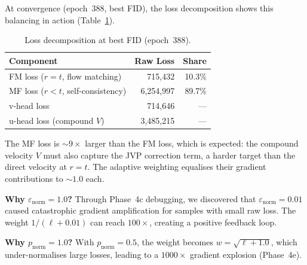At convergence (epoch~388, best FID), the loss decomposition shows this
balancing in action (Table~\ref{tab:loss_decomp}).

\begin{table}[ht]
\centering
\caption{Loss decomposition at best FID (epoch~388).}
\label{tab:loss_decomp}
\begin{tabular}{lrr}
\toprule
\textbf{Component} & \textbf{Raw Loss} & \textbf{Share} \\
\midrule
FM loss ($r=t$, flow matching)       & 715,432   & 10.3\% \\
MF loss ($r<t$, self-consistency)    & 6,254,997 & 89.7\% \\
\midrule
v-head loss                          & 714,646   & --- \\
u-head loss (compound $V$)           & 3,485,215 & --- \\
\bottomrule
\end{tabular}
\end{table}

The MF loss is ${\sim}9\times$ larger than the FM loss, which is expected: the
compound velocity $V$ must also capture the JVP correction term, a harder
target than the direct velocity at $r{=}t$.  The adaptive weighting equalises
their gradient contributions to ${\sim}1.0$ each.

\textbf{Why $\varepsilon_{\mathrm{norm}}{=}1.0$?}  Through Phase~4c debugging,
we discovered that $\varepsilon_{\mathrm{norm}}{=}0.01$ caused catastrophic
gradient amplification for samples with small raw loss.  The weight
$1/(\ell+0.01)$ can reach $100\times$, creating a positive feedback loop.

\textbf{Why $p_{\mathrm{norm}}{=}1.0$?}  With $p_{\mathrm{norm}}{=}0.5$, the
weight becomes $w = \sqrt{\ell+1.0}$, which under-normalises large
losses, leading to a $1000\times$ gradient explosion (Phase~4e).
